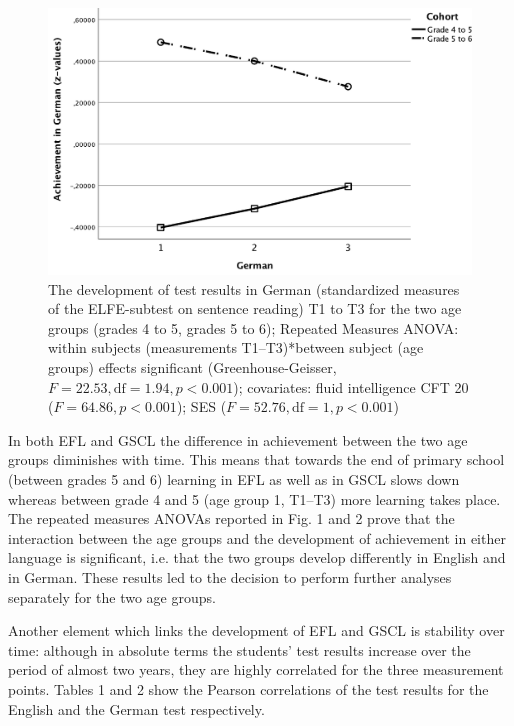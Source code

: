 \documentclass[output=paper]{langsci/langscibook}
\begin{document}
\begin{figure}
\includegraphics[width=\textwidth]{figures/figure9.2.pdf}
\caption{The development of test results in German (standardized measures of the ELFE-subtest on sentence reading) T1 to T3 for the two age groups (grades 4 to 5, grades 5 to 6); Repeated Measures ANOVA: within subjects (measurements T1–T3)*between subject (age groups) effects significant (Greenhouse-Geisser, $F=22.53, \text{df}=1.94, p<0.001$); covariates: fluid intelligence CFT 20 ($F=64.86, p<0.001$); SES ($F=52.76, \text{df}=1, p<0.001$)\label{fig:09:2}}
\end{figure}

In both EFL and GSCL the difference in achievement between the two age groups diminishes with time. This means that towards the end of primary school (between grades 5 and 6) learning in EFL as well as in GSCL slows down whereas between grade 4 and 5 (age group 1, T1–T3) more learning takes place. The repeated measures ANOVAs reported in Fig. 1 and 2 prove that the interaction between the age groups and the development of achievement in either language is significant, i.e. that the two groups develop differently in English and in German. These results led to the decision to perform further analyses separately for the two age groups.

Another element which links the development of EFL and GSCL is stability over time: although in absolute terms the students’ test results increase over the period of almost two years, they are highly correlated for the three measurement points. Tables 1 and 2 show the Pearson correlations of the test results for the English and the German test respectively.
\end{document}
